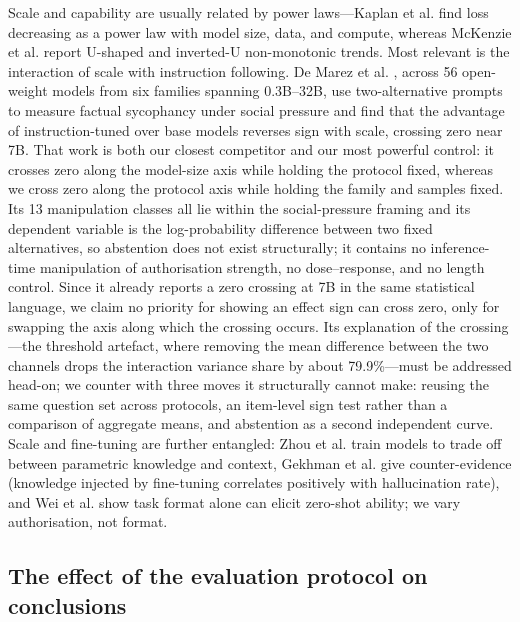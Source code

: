 \documentclass[pdflatex,sn-basic,Numbered]{sn-jnl}
\theoremstyle{thmstyleone}
\theoremstyle{thmstyletwo}
\theoremstyle{thmstylethree}
\begin{document}
Scale and capability are usually related by power laws—Kaplan et al. \cite{ref5} find loss decreasing as a power law with model size, data, and compute, whereas McKenzie et al. \cite{ref6} report U-shaped and inverted-U non-monotonic trends. Most relevant is the interaction of scale with instruction following. De Marez et al. \cite{ref7}, across 56 open-weight models from six families spanning 0.3B–32B, use two-alternative prompts to measure factual sycophancy under social pressure and find that the advantage of instruction-tuned over base models reverses sign with scale, crossing zero near 7B. That work is both our closest competitor and our most powerful control: it crosses zero along the model-size axis while holding the protocol fixed, whereas we cross zero along the protocol axis while holding the family and samples fixed. Its 13 manipulation classes all lie within the social-pressure framing and its dependent variable is the log-probability difference between two fixed alternatives, so abstention does not exist structurally; it contains no inference-time manipulation of authorisation strength, no dose–response, and no length control. Since it already reports a zero crossing at 7B in the same statistical language, we claim no priority for showing an effect sign can cross zero, only for swapping the axis along which the crossing occurs. Its explanation of the crossing—the threshold artefact, where removing the mean difference between the two channels drops the interaction variance share by about 79.9\%—must be addressed head-on; we counter with three moves it structurally cannot make: reusing the same question set across protocols, an item-level sign test rather than a comparison of aggregate means, and abstention as a second independent curve. Scale and fine-tuning are further entangled: Zhou et al. \cite{ref23} train models to trade off between parametric knowledge and context, Gekhman et al. \cite{ref31} give counter-evidence (knowledge injected by fine-tuning correlates positively with hallucination rate), and Wei et al. \cite{ref32} show task format alone can elicit zero-shot ability; we vary authorisation, not format.

\subsection{The effect of the evaluation protocol on conclusions}
\label{sec:2-3}
\end{document}
